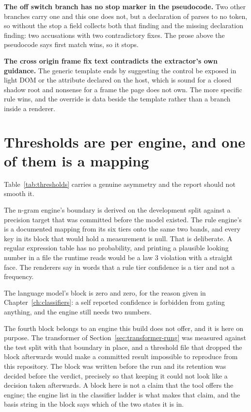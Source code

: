\textbf{The off switch branch has no stop marker in the pseudocode.} Two other
branches carry one and this one does not, but a declaration of  parses
to no token, so without the stop a field collects both that finding and the
missing declaration finding: two accusations with two contradictory fixes. The
prose above the pseudocode says first match wins, so it stops.

\textbf{The cross origin frame fix text contradicts the extractor's own
guidance.} The generic template ends by suggesting the control be exposed in
light DOM or the attribute declared on the host, which is sound for a closed
shadow root and nonsense for a frame the page does not own. The more specific
rule wins, and the override is data beside the template rather than a branch
inside a renderer.

\section{Thresholds are per engine, and one of them is a mapping}

\begin{table}[htbp]
  \centering
  \caption{One threshold block per engine. An engine with no block is an error
  rather than an inheritance.}
  \label{tab:thresholds}
  
\end{table}

Table~\ref{tab:thresholds} carries a genuine asymmetry and the report should not
smooth it.

The n-gram engine's boundary is derived on the development split against a
precision target that was committed before the model existed. The rule engine's
is a documented mapping from its six tiers onto the same two bands, and every
key in its block that would hold a measurement is null. That is deliberate. A
regular expression table has no probability, and printing a plausible looking
number in a file the runtime reads would be a law 3 violation with a straight
face. The renderers say in words that a rule tier confidence is a tier and not a
frequency.

The language model's block is zero and zero, for the reason given in
Chapter~\ref{ch:classifiers}: a self reported confidence is forbidden from
gating anything, and the engine still needs two numbers.

The fourth block belongs to an engine this build does not offer, and it is here
on purpose. The transformer of Section~\ref{sec:transformer-rung} was measured
against the test split with that boundary in place, and a threshold file that
dropped the block afterwards would make a committed result impossible to
reproduce from this repository. The block was written before the run and its
retention was decided before the verdict, precisely so that keeping it could not
look like a decision taken afterwards. A block here is not a claim that the tool
offers the engine; the engine list in the classifier ladder is what makes that
claim, and the basis string in the block says which of the two states it is in.

